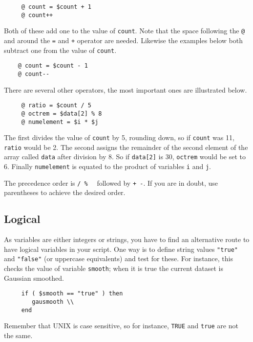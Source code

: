 \small
\begin{verbatim}
     @ count = $count + 1
     @ count++
\end{verbatim}
\normalsize
Both of these add one to the value of {\tt count}.  Note that the space
following the {\tt @} and around the {\tt =} and {\tt +} operator are
needed.  Likewise the examples below both subtract one from the value of
{\tt count}.

\small
\begin{verbatim}
    @ count = $count - 1
    @ count--
\end{verbatim}
\normalsize

There are several other operators, the most important ones are
illustrated below.

\small
\begin{verbatim}
     @ ratio = $count / 5
     @ octrem = $data[2] % 8
     @ numelement = $i * $j
\end{verbatim}
\normalsize
The first divides the value of {\tt count} by 5, rounding down, so
if {\tt count} was 11, {\tt ratio} would be 2.  The second assigns
the remainder of the second element of the array called {\tt data}
after division by 8.  So if {\tt data[2]} is 30, {\tt octrem} would be
set to 6.  Finally {\tt numelement} is equated to the product of
variables {\tt i} and {\tt j}.

The precedence order is {\tt * / \%}~~ followed by {\tt + -}.  If
you are in doubt, use parentheses to achieve the desired order.

\newpage
\subsection{Logical\label{sc4_se_logical}}

As variables are either integers or strings, you have to find an
alternative route to have logical variables in your script.  One way is
to define string values {\tt "true"} and {\tt "false"} (or uppercase
equivalents) and test for these.  For instance, this checks the value of
variable {\tt smooth};  when it is true the current dataset is Gaussian
smoothed.

\small
\begin{verbatim}
     if ( $smooth == "true" ) then
        gausmooth \\
     end
\end{verbatim}
\normalsize
Remember that UNIX is case sensitive, so for instance, {\tt TRUE} and
{\tt true} are not the same.

